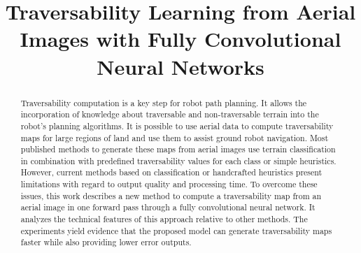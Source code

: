 \documentclass[conference]{IEEEtran}
\begin{document}
\title{Traversability Learning from Aerial Images with Fully Convolutional Neural Networks\\
}

\author{
}

\maketitle

\begin{abstract}
Traversability computation is a key step for robot path planning.
It allows the incorporation of knowledge about traversable and non-traversable terrain into the robot's planning algorithms.
It is possible to use aerial data to compute traversability maps for large regions of land and use them to assist ground robot navigation.
Most published methods to generate these maps from aerial images use terrain classification in combination with predefined traversability values for each class or simple heuristics.
However, current methods based on classification or handcrafted heuristics present limitations with regard to output quality and processing time.
To overcome these issues, this work describes a new method to compute a traversability map from an aerial image in one forward pass through a fully convolutional neural network.
It analyzes the technical features of this approach relative to other methods.
The experiments yield evidence that the proposed model can generate traversability maps faster while also providing lower error outputs.
\end{abstract}
\end{document}
